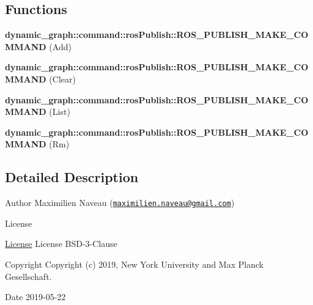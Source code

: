 \subsection*{Functions}
\begin{DoxyCompactItemize}
\item 
\mbox{\label{ros__publish_8hh_a6edff201bb1965b7e9e54641f6109434}} 
{\bfseries dynamic\+\_\+graph\+::command\+::ros\+Publish\+::\+R\+O\+S\+\_\+\+P\+U\+B\+L\+I\+S\+H\+\_\+\+M\+A\+K\+E\+\_\+\+C\+O\+M\+M\+A\+ND} (Add)
\item 
\mbox{\label{ros__publish_8hh_a384348e4e418cc230ce5aff020e2c179}} 
{\bfseries dynamic\+\_\+graph\+::command\+::ros\+Publish\+::\+R\+O\+S\+\_\+\+P\+U\+B\+L\+I\+S\+H\+\_\+\+M\+A\+K\+E\+\_\+\+C\+O\+M\+M\+A\+ND} (Clear)
\item 
\mbox{\label{ros__publish_8hh_ae4e7c7511bb0cfbb523acf5fb2aac3b8}} 
{\bfseries dynamic\+\_\+graph\+::command\+::ros\+Publish\+::\+R\+O\+S\+\_\+\+P\+U\+B\+L\+I\+S\+H\+\_\+\+M\+A\+K\+E\+\_\+\+C\+O\+M\+M\+A\+ND} (List)
\item 
\mbox{\label{ros__publish_8hh_a5ca28cb1740bdb17723412b5ce8d342c}} 
{\bfseries dynamic\+\_\+graph\+::command\+::ros\+Publish\+::\+R\+O\+S\+\_\+\+P\+U\+B\+L\+I\+S\+H\+\_\+\+M\+A\+K\+E\+\_\+\+C\+O\+M\+M\+A\+ND} (Rm)
\end{DoxyCompactItemize}


\subsection{Detailed Description}
\begin{DoxyAuthor}{Author}
Maximilien Naveau (\href{mailto:maximilien.naveau@gmail.com}{\tt maximilien.\+naveau@gmail.\+com}) 
\end{DoxyAuthor}
\begin{DoxyRefDesc}{License}
\item[\hyperlink{license__license000021}{License}]License B\+S\+D-\/3-\/\+Clause \end{DoxyRefDesc}
\begin{DoxyCopyright}{Copyright}
Copyright (c) 2019, New York University and Max Planck Gesellschaft. 
\end{DoxyCopyright}
\begin{DoxyDate}{Date}
2019-\/05-\/22 
\end{DoxyDate}


